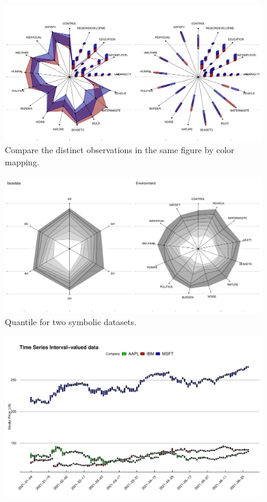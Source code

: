 \documentclass[article]{jss}
\begin{document}
\begin{appendix}
\begin{figure}[t!]
\centering
\includegraphics[width=1\textwidth]{pic/radar} 
\caption{\label{fig:radar}  Compare the distinct observations in the same figure by color mapping.}
\end{figure}



\begin{figure}[t!]
\centering
\includegraphics[width=1\textwidth]{pic/radar_2datasets} 
\caption{\label{fig:quantile2} Quantile for two symbolic datasets.}
\end{figure}



\begin{figure}[t!]
\centering
\includegraphics[width=1\textwidth]{pic/ts_3company} 
\caption{\label{fig:ts}}
\end{figure}



\end{appendix}
\end{document}
